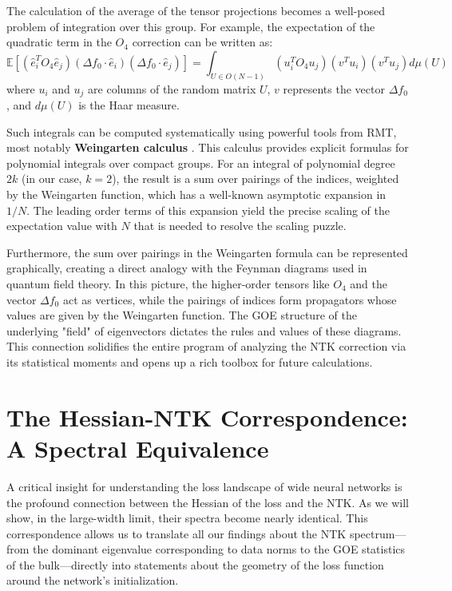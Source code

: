 \documentclass[a4paper]{article}
\begin{document}
The calculation of the average of the tensor projections becomes a well-posed problem of integration over this group. For example, the expectation of the quadratic term in the $O_4$ correction can be written as:
\begin{equation}
\mathbb{E}[(\hat{e}_{i}^{T}O_{4}\hat{e}_{j})(\Delta f_{0}\cdot \hat{e}_{i})(\Delta f_{0}\cdot \hat{e}_{j})] = \int_{U \in O(N-1)} (u_i^T O_4 u_j) (v^T u_i) (v^T u_j) d\mu(U)
\end{equation}
where $u_i$ and $u_j$ are columns of the random matrix $U$, $v$ represents the vector $\Delta f_0$, and $d\mu(U)$ is the Haar measure.

Such integrals can be computed systematically using powerful tools from RMT, most notably \textbf{Weingarten calculus} \cite{collins2022weingarten}. This calculus provides explicit formulas for polynomial integrals over compact groups. For an integral of polynomial degree $2k$ (in our case, $k=2$), the result is a sum over pairings of the indices, weighted by the Weingarten function, which has a well-known asymptotic expansion in $1/N$. The leading order terms of this expansion yield the precise scaling of the expectation value with $N$ that is needed to resolve the scaling puzzle.

Furthermore, the sum over pairings in the Weingarten formula can be represented graphically, creating a direct analogy with the Feynman diagrams used in quantum field theory. In this picture, the higher-order tensors like $O_4$ and the vector $\Delta f_0$ act as vertices, while the pairings of indices form propagators whose values are given by the Weingarten function. The GOE structure of the underlying "field" of eigenvectors dictates the rules and values of these diagrams. This connection solidifies the entire program of analyzing the NTK correction via its statistical moments and opens up a rich toolbox for future calculations.

\newpage
\section{The Hessian-NTK Correspondence: A Spectral Equivalence}

A critical insight for understanding the loss landscape of wide neural networks is the profound connection between the Hessian of the loss and the NTK. As we will show, in the large-width limit, their spectra become nearly identical. This correspondence allows us to translate all our findings about the NTK spectrum—from the dominant eigenvalue corresponding to data norms to the GOE statistics of the bulk—directly into statements about the geometry of the loss function around the network's initialization.
\end{document}
